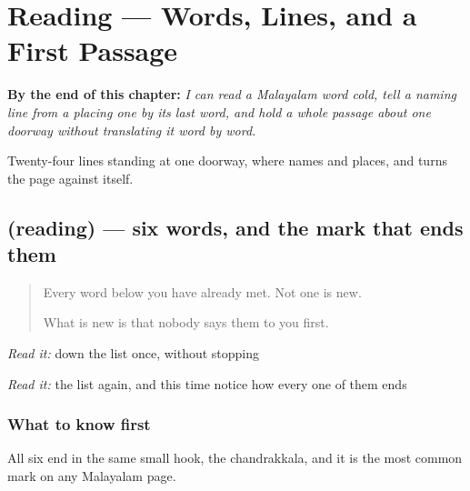 
\chapter{Reading — Words, Lines, and a First Passage}
\label{ch:ml-adyathe-vaayana}

\begin{chapteropening}
\textbf{By the end of this chapter:} \emph{I can read a Malayalam word cold, tell a naming line from a placing one by its last word, and hold a whole passage about one doorway without translating it word by word.}

Twenty-four lines standing at one doorway, where  names and  places, and  turns the page against itself.
\end{chapteropening}

\section[(reading)]{(reading) — six words, and the mark that ends them}

\label{lesson:ML-C69-words}



\begin{quote}
Every word below you have already met. Not one is new.

What is new is that nobody says them to you first.
\end{quote}

\begin{tcolorbox}[breakable,skin=enhanced,colback=orange!6,colframe=orange!45!black,boxrule=0.5pt,arc=1mm,left=6pt,right=6pt,top=4pt,bottom=4pt,fonttitle=\bfseries,title={Read this}]
\begin{quote}
     
\end{quote}

\emph{Read it:} down the list once, without stopping

\emph{Read it:} the list again, and this time notice how every one of them ends
\end{tcolorbox}

\subsection*{What to know first}
All six end in the same small hook, the chandrakkala, and it is the most common mark on any Malayalam page.

